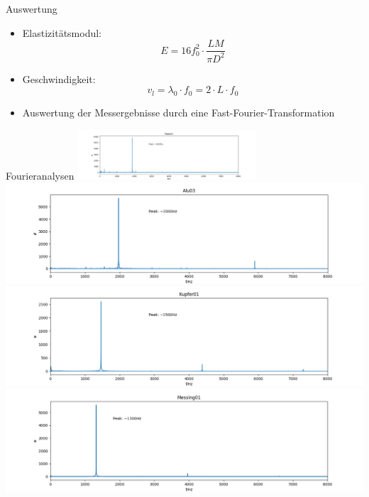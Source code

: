 \documentclass[12pt]{beamer}
\begin{document}
\begin{frame}{Auswertung}
\begin{itemize}
\item Elastizitätsmodul:
\begin{equation}
E = 16 f_0^2 \cdot \dfrac{L M}{\pi D^2}
\end{equation}
\item Geschwindigkeit:
\begin{equation}
v_l = \lambda_0 \cdot f_0 = 2\cdot L \cdot f_0
\end{equation}

\item Auswertung der Messergebnisse durch eine Fast-Fourier-Transformation
\end{itemize}
\end{frame}

\begin{frame}{Fourieranalysen}
\includegraphics[width=0.5\textwidth, height=0.4\textheight]{Bilder/Eisen01_fourier.png}
\includegraphics[width=0.5\linewidth,height=0.4\textheight]{Bilder/Alu03_fourier.png}\\
\includegraphics[width=0.5\linewidth,height=0.4\textheight]{Bilder/Kupfer01_fourier.png}
\includegraphics[width=0.5\linewidth,height=0.4\textheight]{Bilder/Messing01_fourier.png}\\
\end{frame}
\end{document}
